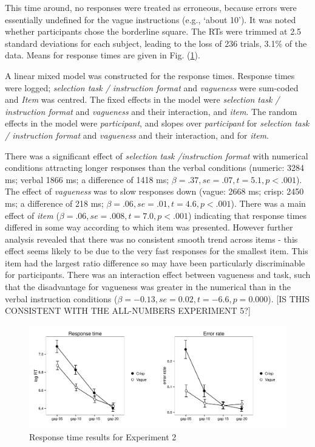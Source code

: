 This time around, no responses were treated as erroneous, because errors were essentially undefined for the vague instructions (e.g., `about 10'). It was noted whether participants chose the borderline square. 
%
The RTs were trimmed at 2.5 standard deviations for each subject, leading to the loss of 236 trials, 3.1\% of the data. Means for response times are given in Fig. (\ref{resultse2}).

A linear mixed model was constructed for the response times.
%
Response times were logged; \emph{selection task / instruction format} and \emph{vagueness} were sum-coded and \emph{Item} was centred. 
% 
The fixed effects in the model were \emph{selection task / instruction format} and \emph{vagueness} and their interaction, and \emph{item}.
% 
The random effects in the model were \emph{participant}, and slopes over \emph{participant} for \emph{selection task / instruction format} and \emph{vagueness} and their interaction, and for \emph{item}.

There was a significant effect of \emph{selection task /instruction format} with numerical conditions attracting longer responses than the verbal conditions (numeric: 3284 ms; verbal 1866 ms; a difference of 1418 ms; $\beta=.37, se=.07, t=5.1, p<.001$). 
% 
The effect of \emph{vagueness} was to slow responses down (vague: 2668 ms; crisp: 2450 ms; a difference of 218 ms; $\beta=.06, se=.01, t=4.6, p<.001$). 
%
There was a main effect of \emph{item} ($\beta=.06, se=.008, t=7.0, p<.001$) indicating that response times differed in some way according to which item was presented. However further analysis revealed that there was no consistent smooth trend across items - this effect seems likely to be due to the very fast responses for the smallest item. This item had the largest ratio difference so may have been particularly discriminable for participants. %
%
There was an interaction effect between vagueness and task, such that the disadvantage for vagueness was greater in the numerical than in the verbal instruction conditions ($\beta=-0.13, se= 0.02, t= -6.6, p=0.000$).  [IS THIS CONSISTENT WITH THE ALL-NUMBERS EXPERIMENT 5?]

\begin{figure}[b]
\sidecaption
\includegraphics[scale=.5]{images/resultse1}
\caption{Response time results for Experiment 2}
\label{resultse2}
\end{figure}

